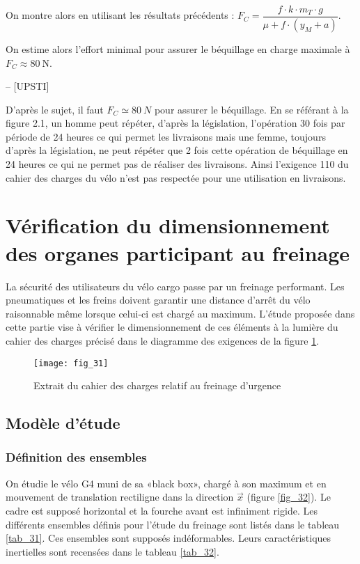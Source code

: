 On montre alors en utilisant les résultats précédents :
$F_{C}=\dfrac{f \cdot k \cdot m_{T} \cdot g}{\mu+f \cdot\left(y_{M}+a\right)}$.

On estime alors l'effort minimal pour assurer le béquillage en charge maximale à \(F_{C} \approx 80 \mathrm{~N}\).

\ifprof
\begin{corrige}-- [UPSTI]

D’après le sujet, il faut $F_C \simeq \SI{80}{N}$ pour assurer le béquillage. En se référant à la figure 2.1, un homme peut répéter, d’après la législation, l’opération 30 fois par période de 24 heures ce qui permet les livraisons mais une femme, toujours d’après la législation, ne peut répéter que 2 fois cette opération de béquillage en 24 heures ce qui ne permet pas de réaliser des livraisons. Ainsi l’exigence 110 du cahier des charges du vélo n’est pas respectée pour une utilisation en livraisons.

\end{corrige}
\else
\fi


\section{Vérification du dimensionnement des organes participant au freinage \label{ATS_2024_sec3}}
\ifprof
\else
La sécurité des utilisateurs du vélo cargo passe par un freinage performant. Les pneumatiques et les freins doivent garantir une distance d'arrêt du vélo raisonnable même lorsque celui-ci est chargé au maximum. L'étude proposée dans cette partie vise à vérifier le dimensionnement de ces éléments à la lumière du cahier des charges précisé dans le diagramme des exigences de la figure \ref{fig_3_cargo}.

\begin{figure}[!h]
\centering
\texttt{[image: fig\_31]}
\caption{\label{fig_3_cargo}Extrait du cahier des charges relatif au freinage d'urgence}
\end{figure}

\fi

\subsection{Modèle d'étude}
\ifprof
\else
\subsubsection{Définition des ensembles}
On étudie le vélo G4 muni de sa «black box», chargé à son maximum et en mouvement de translation rectiligne dans la direction \(\vec{x}\) (figure \ref{fig_32}). Le cadre est supposé horizontal et la fourche avant est infiniment rigide. Les différents ensembles définis pour l'étude du freinage sont listés dans le tableau \ref{tab_31}. Ces ensembles sont supposés indéformables. Leurs caractéristiques inertielles sont recensées dans le tableau \ref{tab_32}.

